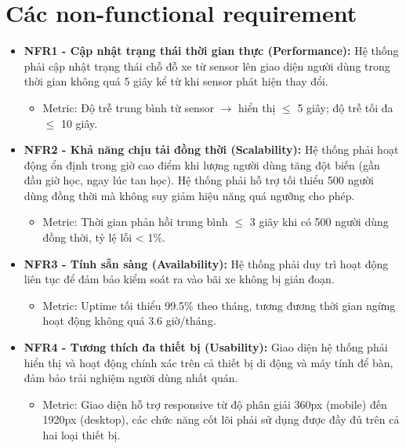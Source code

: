 \section{Các non-functional requirement}

\begin{itemize}
    \item \textbf{NFR1 - Cập nhật trạng thái thời gian thực (Performance):} Hệ thống phải cập nhật trạng thái chỗ đỗ xe từ sensor lên giao diện người dùng trong thời gian không quá 5 giây kể từ khi sensor phát hiện thay đổi. %
    \vspace*{-5pt}
    \begin{itemize}
        \item Metric: Độ trễ trung bình từ sensor $\rightarrow$ hiển thị $\le$ 5 giây; độ trễ tối đa $\le$ 10 giây. %
    \end{itemize}

    \item \textbf{NFR2 - Khả năng chịu tải đồng thời (Scalability):} Hệ thống phải hoạt động ổn định trong giờ cao điểm khi lượng người dùng tăng đột biến (gần đầu giờ học, ngay lúc tan học). %
    Hệ thống phải hỗ trợ tối thiểu 500 người dùng đồng thời mà không suy giảm hiệu năng quá ngưỡng cho phép. %
    \vspace*{-5pt}
    \begin{itemize}
        \item Metric: Thời gian phản hồi trung bình $\le$ 3 giây khi có 500 người dùng đồng thời, tỷ lệ lỗi < 1\%. %
    \end{itemize}

    \item \textbf{NFR3 - Tính sẵn sàng (Availability):} Hệ thống phải duy trì hoạt động liên tục để đảm bảo kiểm soát ra vào bãi xe không bị gián đoạn. %
    \vspace*{-5pt}
    \begin{itemize}
        \item Metric: Uptime tối thiểu 99.5\% theo tháng, tương đương thời gian ngừng hoạt động không quá 3.6 giờ/tháng. %
    \end{itemize}

    \item \textbf{NFR4 - Tương thích đa thiết bị (Usability):} Giao diện hệ thống phải hiển thị và hoạt động chính xác trên cả thiết bị di động và máy tính để bàn, đảm bảo trải nghiệm người dùng nhất quán. %
    \vspace*{-5pt}
    \begin{itemize}
        \item Metric: Giao diện hỗ trợ responsive từ độ phân giải 360px (mobile) đến 1920px (desktop), các chức năng cốt lõi phải sử dụng được đầy đủ trên cả hai loại thiết bị. %
    \end{itemize}


\end{itemize}
